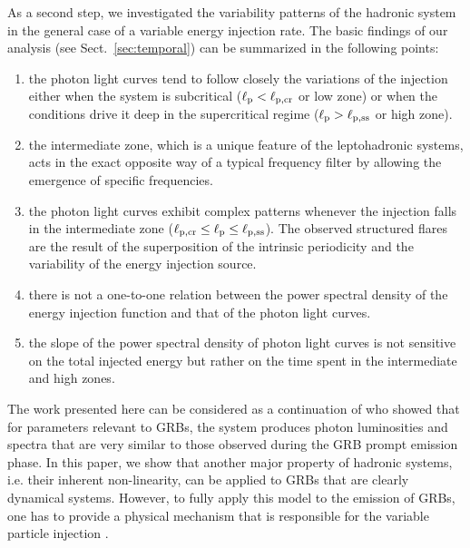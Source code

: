 \documentclass[fleqn,usenatbib]{mnras}
\newcommand{\lp}{\ell_{\rm p}}
\newcommand{\lpcrss}{\ell_{\rm p, ss}}
\newcommand{\lpcr}{\ell_{\rm p,cr}}
\begin{document}
{As a second step, we investigated the variability patterns of the hadronic system in the general case of a variable energy injection rate. The basic findings of our analysis (see Sect.~\ref{sec:temporal}) can be summarized in the following points:
\begin{enumerate} 
 \item the photon light curves tend to follow closely the variations of the injection 
 either when the system is subcritical ($\lp < \lpcr$ or low zone) or when the conditions drive it
 deep in the supercritical regime ($\lp > \lpcrss$ or high zone). 
 \item the  intermediate zone, which is a unique feature of
the leptohadronic systems, acts in the exact opposite way 
of a typical frequency filter by allowing the emergence of specific frequencies.
 \item the photon light curves exhibit complex patterns whenever the injection 
 falls in the intermediate zone ($\lpcr \le \lp \le \lpcrss$). The observed structured flares
 are the result of the superposition of the intrinsic periodicity and the variability of the energy injection source. 
\item there is not a one-to-one relation between the power spectral density of the energy injection function 
and that of the photon light curves. 
\item the slope of the power spectral density of photon light curves is not sensitive on the 
total injected energy but rather on the time spent in the intermediate and high zones. 
\end{enumerate} 
 

The work presented here can be considered as a continuation of \cite{pdmg14} who showed that for parameters relevant to GRBs, the system produces photon luminosities and spectra that are very similar to those observed during the GRB prompt emission phase. In this paper, we show that another major property of hadronic systems, i.e. their inherent non-linearity, can be applied to GRBs that are clearly dynamical systems. However, to fully apply this model to the emission of GRBs, one has to provide a physical mechanism that is responsible for the variable particle injection \citep[for other scenarios for GRB variability, see e.g.][]{Z14}.}
\end{document}
